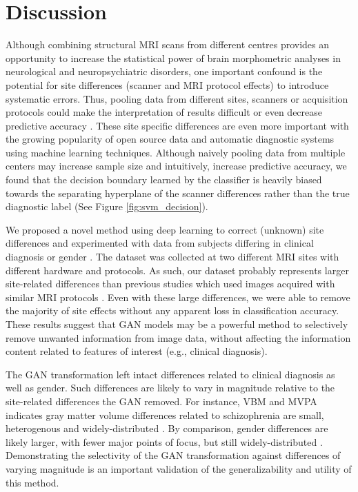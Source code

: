 \section{Discussion}
Although combining structural MRI scans from different centres provides an opportunity to increase the statistical power of brain morphometric analyses in neurological and neuropsychiatric disorders, one important confound is the potential for site differences (scanner and MRI protocol effects) to introduce systematic errors. Thus, pooling data from different sites, scanners or acquisition protocols could make the interpretation of results difficult or even decrease predictive accuracy \citep{winterburn2017can,schnack2016detecting}. These site specific differences are even more important with the growing popularity of open source data and automatic diagnostic systems using machine learning techniques. Although naively pooling data from multiple centers may increase sample size and intuitively, increase predictive accuracy, we found that the decision boundary learned by the classifier is heavily biased towards the separating hyperplane of the scanner differences rather than the true diagnostic label (See Figure \ref{fig:svm_decision}).

We proposed a novel method using deep learning to correct (unknown) site differences and experimented with data from subjects differing in clinical diagnosis or gender . The dataset was collected at two different MRI sites with different hardware and protocols. As such, our dataset probably represents larger site-related differences than previous studies which used images acquired with similar MRI protocols \citep{kostro2014correction}. Even with these large differences, we were able to remove the majority of site effects without any apparent loss in classification accuracy. These results suggest that GAN models may be a powerful method to selectively remove unwanted information from image data, without affecting the information content related to features of interest (e.g., clinical diagnosis).

The GAN transformation left intact differences related to clinical diagnosis as well as gender. Such differences are likely to vary in magnitude relative to the site-related differences the GAN removed. For instance, VBM and MVPA indicates gray matter volume differences related to schizophrenia are small, heterogenous and widely-distributed \citep{mourao2005classifying,mourao2012individualized}. By comparison, gender differences are likely larger, with fewer major points of focus, but still widely-distributed \citep{ruigrok2014meta}. Demonstrating the selectivity of the GAN transformation against differences of varying magnitude is an important validation of the generalizability and utility of this method.

